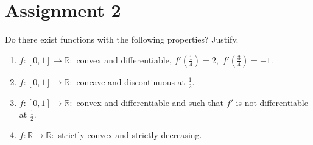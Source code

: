 \documentclass[12pt]{article}
\theoremstyle{definition}
\begin{document}
\section{Assignment 2}
Do there exist functions with the following properties? Justify.
\begin{enumerate}[leftmargin=*]
	\item $f:[0, 1] \to \mathbb{R}:$ convex and differentiable, $f'\left(\frac{1}{4}\right) = 2,$ $f'\left(\frac{3}{4}\right) = -1.$
	\item $f:[0, 1] \to \mathbb{R}:$ concave and discontinuous at $\frac{1}{2}.$
	\item $f:[0, 1] \to \mathbb{R}:$ convex and differentiable and such that $f'$ is not differentiable at $\frac{1}{2}.$
	\item $f:\mathbb{R} \to \mathbb{R}:$ strictly convex and strictly decreasing.
\end{enumerate}
\end{document}
